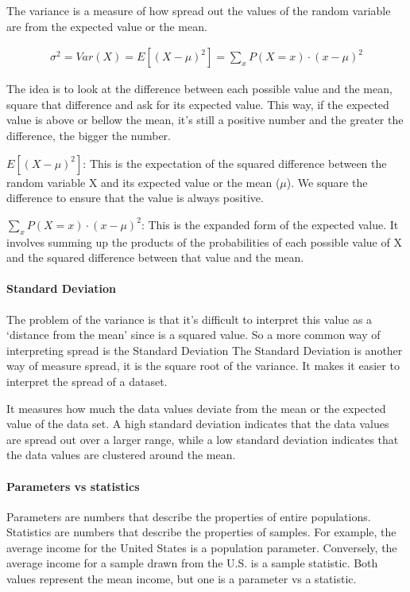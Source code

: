 \documentclass[11pt]{article}
\begin{document}
The variance is a measure of how spread out the values of the random
variable are from the expected value or the mean.

\begin{gather}
  \sigma^2 = Var(X) = E[(X- \mu)^2] = \sum_x P(X=x) \cdot (x - \mu)^2 
\end{gather}
  


The idea is to look at the difference between each possible value and
the mean, square that difference and ask for its expected value. This
way, if the expected value is above or bellow the mean, it's still a
positive number and the greater the difference, the bigger the number.

\(E[(X - \mu)^2]\): This is the expectation of the squared difference
between the random variable X and its expected value or the mean
(\(\mu\)). We square the difference to ensure that the value is always
positive.

\(\sum_x P(X=x) \cdot (x - \mu)^2\): This is the expanded form of the
expected value. It involves summing up the products of the probabilities
of each possible value of X and the squared difference between that
value and the mean.


\hypertarget{standard-deviation}{%
\paragraph{Standard Deviation}\label{standard-deviation}}

The problem of the variance is that it's difficult to interpret this
value as a `distance from the mean' since is a squared value. So a more
common way of interpreting spread is the Standard Deviation The Standard
Deviation is another way of measure spread, it is the square root of the
variance. It makes it easier to interpret the spread of a dataset.

It measures how much the data values deviate from the mean or the
expected value of the data set. A high standard deviation indicates that
the data values are spread out over a larger range, while a low standard
deviation indicates that the data values are clustered around the mean.

\hypertarget{Parameters vs Statistics}{%
\paragraph*{Parameters vs statistics}\label{parameters-vs-statistics}}
Parameters are numbers that describe the properties of
entire populations. Statistics are numbers that describe the properties
of samples. For example, the average income for the United States is a
population parameter. Conversely, the average income for a sample drawn
from the U.S. is a sample statistic. Both values represent the mean
income, but one is a parameter vs a statistic.
\end{document}
